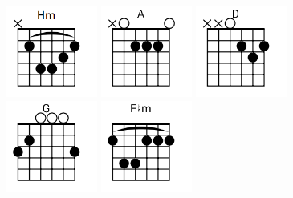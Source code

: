 \begin{figure}[h]
\predtitle\centering
\includegraphics[width=3cm]{../Akordy/hm.png}
\includegraphics[width=3cm]{../Akordy/a.png}
\includegraphics[width=3cm]{../Akordy/d.png}
\includegraphics[width=3cm]{../Akordy/g.png}
\includegraphics[width=3cm]{../Akordy/fxm.png}
\end{figure}
